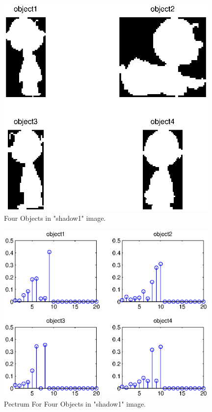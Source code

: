 \documentclass[paper=a4, fontsize=11pt]{scrartcl}
\begin{document}
\begin{figure}
	\centering
	\includegraphics[width=11cm]{4objectinshadow1.eps}
	\caption{ Four Objects in "shadow1" image. }
	\label{fig:24}
\end{figure}

\begin{figure}
	\centering
	\includegraphics[width=11cm]{pecstrum_for_4objectinshadow1.eps}
	\caption{ Pectrum For Four Objects in "shadow1" image. }
	\label{fig:25}
\end{figure}
\end{document}
